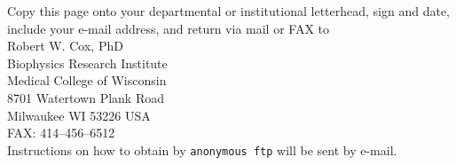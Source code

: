 Copy this page onto your departmental or institutional letterhead,
sign and date, include your e-mail address, and return via mail or FAX to\\[.5ex]
\hspace*{3em} Robert W. Cox, PhD \\
\hspace*{3em} Biophysics Research Institute \\
\hspace*{3em} Medical College of Wisconsin \\
\hspace*{3em} 8701 Watertown Plank Road \\
\hspace*{3em} Milwaukee WI 53226 USA\\[0.5ex]
\hspace*{3em} FAX: 414--456--6512 \\[0.5ex]
Instructions on how to obtain \afnit by {\tt anonymous ftp}
will be sent by e-mail.


